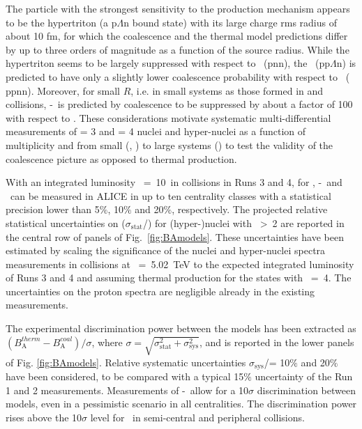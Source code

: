 The particle with the strongest sensitivity to the production mechanism appears to be the hypertriton (a p$\Lambda$n bound state) with its large charge rms radius of about 10 fm, for which the coalescence and the thermal model predictions differ by up to three orders of magnitude as a function of the source radius. 
While the hypertriton seems to be largely suppressed with respect to \hethree~($\mathrm{pnn}$), the \hypfour\ ($\mathrm{pp}\Lambda\mathrm{n}$) is predicted to have only a slightly lower coalescence probability with respect to \hefour~($\mathrm{ppnn}$). 
Moreover, for small $R$, i.e. in small systems as those formed in \pp and \pPb collisions, \hyp~is predicted by coalescence to be suppressed by about a factor of 100 with respect to \hethree. 
These considerations motivate systematic multi-differential measurements of \Anucl = 3 and \Anucl = 4 nuclei and hyper-nuclei as a function of multiplicity and from small (\pp, \pPb) to large systems (\PbPb) to test the validity of the coalescence picture as opposed to thermal production.

With an integrated luminosity \Lint~=~10~\nbInv in \PbPb collisions in Runs 3 and 4, \BA for \hethree, \hyp~and \hefour~can be measured in ALICE in up to ten centrality classes with a statistical precision lower than 5$\%$, 10$\%$ and 20$\%$, respectively.
The projected relative statistical uncertainties on \BA ($\sigma_{\mathrm{stat}}$/\BA) for (hyper-)nuclei with \Anucl~>~2 are reported in the central row of panels of Fig.~\ref{fig:BAmodels}.
These uncertainties have been estimated by scaling the significance of the nuclei and hyper-nuclei spectra measurements in \PbPb collisions at \sqrtsNN~=~5.02~TeV \cite{ALICE-PUBLIC-2017-006, Trogolo:2017oii} to the expected integrated luminosity of Runs 3 and 4 and assuming thermal production for the states with \Anucl~=~4. The uncertainties on the proton spectra are negligible already in the existing measurements. 
 
The experimental discrimination power between the models has been extracted as $(B_{\mathrm{A}}^{therm} - B_{\mathrm{A}}^{coal})/\sigma$, where $\sigma = \sqrt{\sigma_{\mathrm{stat}}^{2} + \sigma_{\mathrm{sys}}^{2}}$, and is reported in the lower panels of Fig. \ref{fig:BAmodels}.
Relative systematic uncertainties $\sigma_{\mathrm{sys}}$/\BA = 10$\%$ and 20$\%$ have been considered, to be compared with a typical 15$\%$ uncertainty of the Run 1 and 2 measurements. 
Measurements of \hyp~allow for a 10$\sigma$ discrimination between models, even in a pessimistic scenario in all centralities. The discrimination power rises above the 10$\sigma$ level for \hefour~in semi-central and peripheral collisions.  

